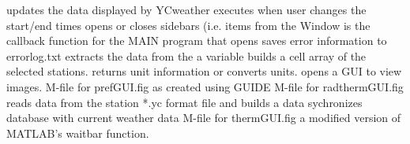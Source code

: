 \begin{itemize}[itemsep=0pt]
     updates the data displayed by YCweather
     executes when user changes the start/end times
     opens or closes sidebars (i.e. items from the Window
     is the callback function for the MAIN program that opens
     saves error information to errorlog.txt
     extracts the data from the a variable
     builds a cell array of the selected stations.
     returns unit information or converts units.
     opens a GUI to view images.
     M-file for prefGUI.fig as created using GUIDE
     M-file for radthermGUI.fig
     reads data from the station *.yc format file and builds a data
     sychronizes database with current weather data
     M-file for thermGUI.fig
     a modified version of MATLAB's waitbar function.
\end{itemize}
